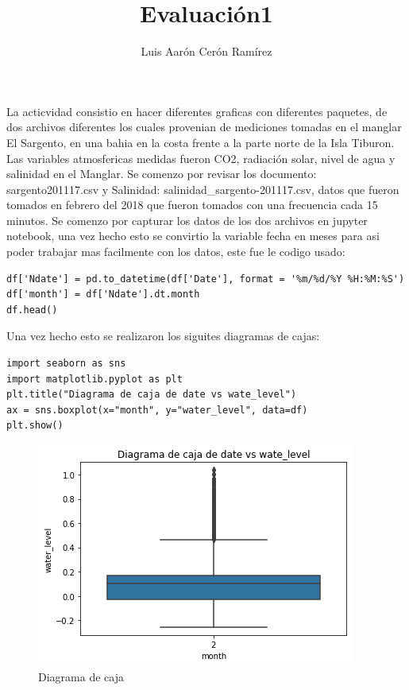 \documentclass{article}
\title{Evaluación1}
\author{Luis Aarón Cerón Ramírez}
\begin{document}
\maketitle
La acticvidad consistio en hacer diferentes graficas con diferentes paquetes, de dos archivos diferentes los cuales provenian de mediciones tomadas en el manglar El Sargento, en una bahia en la costa frente a la parte norte de la Isla Tiburon.
\newline
Las variables atmosfericas medidas fueron CO2, radiación solar, nivel de agua y salinidad en el Manglar.
\newline
Se comenzo por revisar los documento: sargento\-201117.csv y  Salinidad: salinidad\_sargento-201117.csv, datos que fueron tomados en febrero del 2018 que fueron tomados con una frecuencia cada 15 minutos.
\newline
Se comenzo por capturar los datos de los dos archivos en jupyter notebook, una vez hecho esto se convirtio la variable fecha en meses para asi poder trabajar mas facilmente con los datos, este fue le codigo usado:
\begin{verbatim}
df['Ndate'] = pd.to_datetime(df['Date'], format = '%m/%d/%Y %H:%M:%S')
df['month'] = df['Ndate'].dt.month
df.head()
\end{verbatim}

Una vez hecho esto se realizaron los siguites diagramas de cajas:
\begin{verbatim}
import seaborn as sns
import matplotlib.pyplot as plt
plt.title("Diagrama de caja de date vs wate_level")
ax = sns.boxplot(x="month", y="water_level", data=df)
plt.show()
\end{verbatim}

\begin{figure}[h]
\centering
\includegraphics[scale=0.5]{diagrama1.png}
\caption{Diagrama de caja}
\end{figure}
\end{document}

